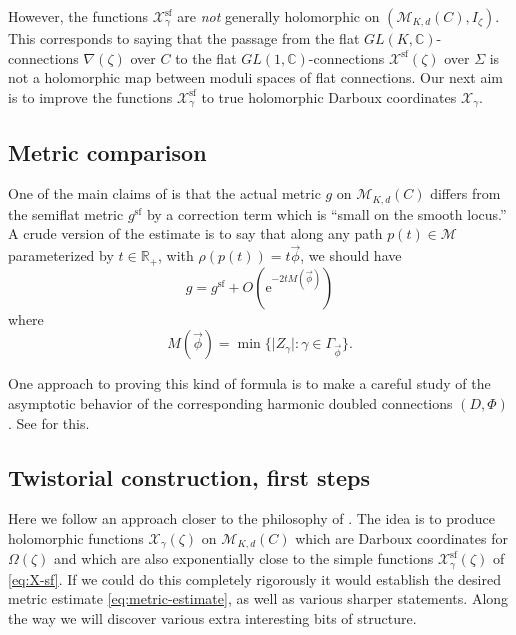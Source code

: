 \documentclass[12pt,letterpaper,reqno]{article}
\numberwithin{equation}{section}
\newcommand{\cM}{\ensuremath{\mathcal M}}
\newcommand{\cX}{\ensuremath{\mathcal X}}
\newcommand{\R}{\ensuremath{\mathbb R}}
\newcommand{\C}{\ensuremath{\mathbb C}}
\newcommand{\e}{{\mathrm e}}
\renewcommand{\sf}{\mathrm{sf}}
\newcommand{\abs}[1]{\lvert#1\rvert}
\newcommand{\ti}[1]{\textit{#1}}
\begin{document}
However, the functions $\cX_\gamma^\sf$ are \ti{not} generally holomorphic
on $(\cM_{K,d}(C), I_\zeta)$.
This corresponds to saying that the
passage from the flat $GL(K,\C)$-connections
$\nabla(\zeta)$ over $C$ to the flat $GL(1,\C)$-connections
$\cX^\sf(\zeta)$ over $\Sigma$ is not a holomorphic map
between moduli spaces of flat connections.
Our next aim is to improve the functions
$\cX_\gamma^\sf$ to true holomorphic Darboux
coordinates $\cX_\gamma$.


\subsection{Metric comparison}

One of the main claims of \cite{Gaiotto:2008cd} is that
the actual metric $g$ on $\cM_{K,d}(C)$ differs
from the semiflat metric $g^\sf$ by a correction term
which is ``small on the smooth locus.'' A crude version of the
estimate is to say that along any path $p(t) \in \cM$
parameterized by $t \in \R_+$, with
$\rho(p(t)) = t \vec\phi$, we should have
\begin{equation} \label{eq:metric-estimate}
  g = g^\sf + O(\e^{-2 t M({\vec\phi})})
\end{equation}
where
\begin{equation}
  M({\vec\phi}) = \min\{\abs{Z_\gamma}: \gamma \in \Gamma_{\vec\phi} \}.
\end{equation}

One approach to proving this kind of formula
is to make a careful study of the asymptotic
behavior of the corresponding harmonic doubled connections $(D,\Phi)$.
See \cite{Mazzeo2014} for this.



\subsection{Twistorial construction, first steps}

Here we follow an approach closer to the philosophy of
\cite{Gaiotto:2008cd}. The idea is to produce holomorphic functions
$\cX_\gamma(\zeta)$ on $\cM_{K,d}(C)$ which are Darboux coordinates for
$\Omega(\zeta)$ and which are also exponentially close
to the simple functions $\cX_\gamma^\sf(\zeta)$
of \eqref{eq:X-sf}. If we could do this completely rigorously
it would establish the desired metric estimate
\eqref{eq:metric-estimate}, as well as various sharper
statements.
Along the way we will discover various
extra interesting bits of structure.
\end{document}
